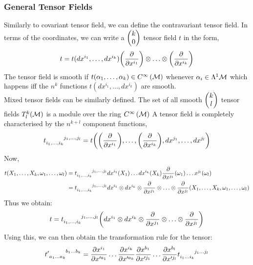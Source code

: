 \subsubsection{General Tensor Fields}
Similarly to covariant tensor field, we can define the contravariant tensor field. In terms of the coordinates, we can write a $\mqty(k\\0)$ tensor field $t$ in the form,
$$t = t(dx^{i_1},\ldots,dx^{i_k})\qty(\pdv{x^{i_1}})\otimes\ldots\otimes\qty(\pdv{x^{i_k}})$$
The tensor field is smooth if $t(\alpha_1, \ldots, \alpha_k)\in C^{\infty}\left(\mathcal M\right)$ whenever $\alpha_i\in \Lambda^1\mathcal M$ which happens iff the $n^k$ functions $t(dx^{i_1},\ldots,dx^{i_k})$ are smooth.\\[0.2cm]
Mixed tensor fields can be similarly defined. The set of all smooth $\mqty(k\\l)$ tensor fields $T^k_l(\mathcal M)$ is a module over the ring $C^{\infty}\left(\mathcal M\right)$
A tensor field is completely characterised by the $n^{k+l}$ component functions, 
$$\tensor{t}{_{i_1,\ldots,i_k}^{j_1,\ldots,j_l}} = t\qty(\qty(\pdv{x^{i_1}}),\ldots,\qty(\pdv{x^{i_k}}), dx^{j_1},\ldots,dx^{j_l})$$
Now, \begin{align*}
    t(X_1,\ldots,X_k, \omega_1,\ldots,\omega_l) &= \tensor{t}{_{i_1,\ldots,i_k}^{j_1,\ldots,j_l}} dx^{i_1}(X_1)\ldots dx^{i_k}(X_k)\pdv{x^{j_1}} (\omega_1)\ldots {x^{j_l}} (\omega_l)\\
    &=\tensor{t}{_{i_1,\ldots,i_k}^{j_1,\ldots,j_l}}  dx^{i_1}\otimes dx^{i_k}\otimes \pdv{x^{j_1}}\otimes\ldots\otimes \pdv{x^{j_l}}(X_1, \ldots,X_k,\omega_1,\ldots, \omega_l)
\end{align*}
Thus we obtain:$$t=\tensor{t}{_{i_1,\ldots,i_k}^{j_1,\ldots,j_l}}  \qty(dx^{i_1}\otimes dx^{i_k}\otimes \pdv{x^{j_1}}\otimes\ldots\otimes \pdv{x^{j_l}})$$
Using this, we can then obtain the transformation rule for the tensor:
$$\tensor{{t'}}{_{a_1\ldots a_k}^{b_1\ldots b_k}} = \pdv{x^{i_1}}{x'^{a_1}}\ldots  \pdv{x^{i_k}}{x'^{a_k}} \pdv{x^{b_1}}{x'^{j_1}}\ldots  \pdv{x^{b_l}}{x'^{j_l}}\tensor{{t}}{_{i_1\ldots i_k}^{j_1\ldots j_l}} $$
